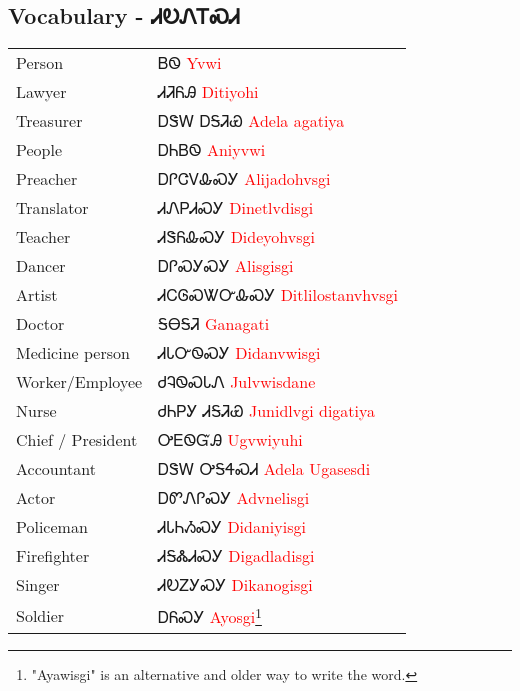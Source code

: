 \newpage\subsection{Vocabulary - ᏗᎧᏁᎢᏍᏗ 
}
\begin{minipage}{\linewidth}
\begin{tabular}{p{5cm} p{9cm}}
Person & ᏴᏫ 
 \newline \textcolor{red}{Yvwi}\\
Lawyer & ᏗᏘᏲᎯ 
 \newline \textcolor{red}{Ditiyohi}\\
Treasurer & ᎠᏕᎳ ᎠᎦᏘᏯ 
 \newline \textcolor{red}{Adela agatiya}\\
People & ᎠᏂᏴᏫ 
 \newline \textcolor{red}{Aniyvwi}\\
Preacher & ᎠᎵᏣᏙᎲᏍᎩ 
 \newline \textcolor{red}{Alijadohvsgi}\\
Translator & ᏗᏁᏢᏗᏍᎩ 
 \newline \textcolor{red}{Dinetlvdisgi}\\
Teacher & ᏗᏕᏲᎲᏍᎩ 
 \newline \textcolor{red}{Dideyohvsgi}\\
Dancer & ᎠᎵᏍᎩᏍᎩ 
 \newline \textcolor{red}{Alisgisgi}\\
Artist & ᏗᏟᎶᏍᏔᏅᎲᏍᎩ 
 \newline \textcolor{red}{Ditlilostanvhvsgi}\\
Doctor & ᎦᎾᎦᏘ 
 \newline \textcolor{red}{Ganagati}\\
Medicine person & ᏗᏓᏅᏫᏍᎩ 
 \newline \textcolor{red}{Didanvwisgi}\\
Worker/Employee & ᏧᎸᏫᏍᏓᏁ 
 \newline \textcolor{red}{Julvwisdane}\\
Nurse & ᏧᏂᏢᎩ ᏗᎦᏘᏯ 
 \newline \textcolor{red}{Junidlvgi digatiya}\\
Chief / President & ᎤᎬᏫᏳᎯ 
 \newline \textcolor{red}{Ugvwiyuhi}\\
Accountant & ᎠᏕᎳ ᎤᎦᏎᏍᏗ 
 \newline \textcolor{red}{Adela Ugasesdi}\\
Actor & ᎠᏛᏁᎵᏍᎩ 
 \newline \textcolor{red}{Advnelisgi}\\
Policeman & ᏗᏓᏂᏱᏍᎩ 
 \newline \textcolor{red}{Didaniyisgi}\\
Firefighter & ᏗᎦᏜᏗᏍᎩ 
 \newline \textcolor{red}{Digadladisgi}\\
Singer & ᏗᎧᏃᎩᏍᎩ 
 \newline \textcolor{red}{Dikanogisgi}\\
Soldier & ᎠᏲᏍᎩ 
 \newline \textcolor{red}{Ayosgi}\footnote{"Ayawisgi" is an alternative and older way to write the word.}\\
\end{tabular}
\end{minipage}

